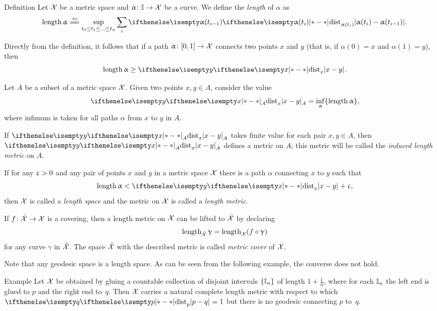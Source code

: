 \begin{thm}{Definition}
Let $\mathcal{X}$ be a metric space and
$\alpha\: \II\to \spc{X}$ be a curve.
We define the \emph{length} of $\alpha$ as 
\[
\length \alpha \df \sup_{t_0\le t_1\le\ldots\le t_n}\sum_i \dist{\alpha(t_i)}{\alpha(t_{i-1})}{}.
\]
\end{thm}

Directly from the definition, it follows that if a path $\alpha\:[0,1]\to\spc{X}$ connects two points $x$ and $y$ 
(that is, if $\alpha(0)=x$ and $\alpha(1)=y$), then 
\[\length\alpha\ge \dist{x}{y}{}.\]

Let $A$ be a subset of a metric space $\mathcal{X}$.
Given two points $x,y\in A$,
consider the value
\[\dist{x}{y}{A}=\inf_{\alpha}\{\length\alpha\},\]
where infimum is taken for all paths $\alpha$ from $x$ to $y$ in $A$.

If $\dist{x}{y}{A}$ takes finite value for each pair $x,y\in A$,
then $\dist{x}{y}{A}$ defines a metric on  $A$;
this metric will be called the \emph{induced length metric} on $A$.

If for any $\upvarepsilon>0$ and any pair of points $x$ and $y$ in a metric space $\mathcal{X}$ there is a path $\alpha$ connecting $x$ to $y$ such that
\[\length\alpha< \dist{x}{y}{}+\eps,\]
then $\mathcal{X}$ is called a \emph{length space} and the metric on $\mathcal{X}$ is called a \emph{length metric}.\label{page:length metric}

If $f\:\~{\spc{X}}\to\spc{X}$ is a covering,
then a length metric on $\mathcal{X}$ can be lifted to $\tilde{\mathcal{X}}$
by declaring 
\[\length_{\~{\spc{X}}}\gamma=\length_{\spc{X}}(f\circ\gamma)\]
for any curve $\gamma$ in $\tilde{\mathcal{X}}$.
The space $\tilde{\mathcal{X}}$ with the described metric is called \emph{metric cover} of $\mathcal{X}$.

Note that any geodesic space is a length space.
As can be seen from the following example, the converse does not hold.


\begin{thm}{Example}
Let $\mathcal{X}$ be obtained by gluing a countable collection of disjoint intervals $\{\mathbb{I}_n\}$ of length $1+\tfrac1n$, where for each $\mathbb{I}_n$ the left end is glued to $p$ and the right end to~$q$.
Then $\mathcal{X}$ carries a natural complete length metric with respect to which $\dist{p}{q}{}=1$ but there is no geodesic connecting $p$ to~$q$.
\end{thm}



